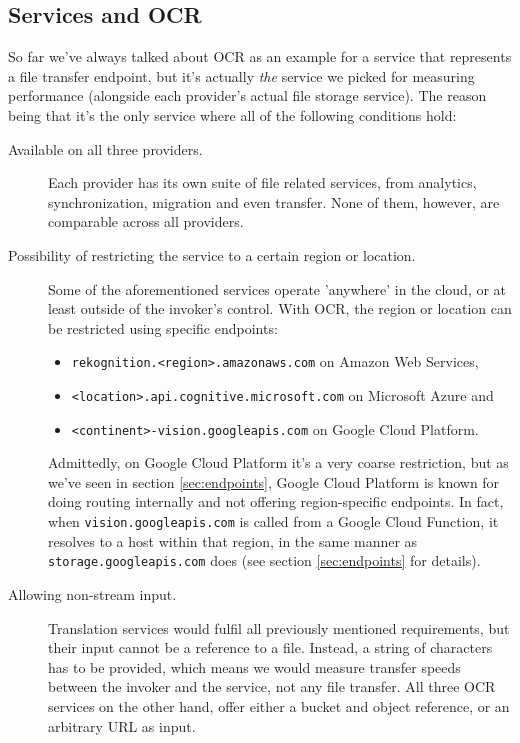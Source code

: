 \documentclass[a4paper,bibliography=totoc]{scrartcl}
\newcommand{\Azure}{Microsoft Azure\xspace}
\newcommand{\GCP}{Google Cloud Platform\xspace}
\newcommand{\AWS}{Amazon Web Services\xspace}
\begin{document}
\subsection{Services and OCR}\label{sec:services_ocr}
So far we've always talked about OCR as an example for a service that represents a file transfer endpoint, but it's actually \textit{the} service we picked for measuring performance (alongside each provider's actual file storage service). The reason being that it's the only service where all of the following conditions hold:
\begin{description}
    \item[Available on all three providers.\cite{aws_rekognition,azure_ocr,gcp_annotate}]
    Each provider has its own suite of file related services, from analytics,\cite{aws_analytics} synchronization,\cite{azure_filesync}  migration and even transfer.\cite{gcp_transfer} None of them, however, are comparable across all providers.
    \item[Possibility of restricting the service to a certain region or location.] Some of the aforementioned services operate 'anywhere' in the cloud, or at least outside of the invoker's control. With OCR, the region or location can be restricted using specific endpoints:
    \begin{itemize}
        \item \texttt{rekognition.<region>.amazonaws.com} on \AWS,\cite{aws_ocr_endpoints}
        \item \texttt{<location>.api.cognitive.microsoft.com} on \Azure\cite{azure_ocr_endpoints} and
        \item \texttt{<continent>-vision.googleapis.com} on \GCP.\cite{gcp_ocr_endpoint}
    \end{itemize}
    Admittedly, on \GCP it's a very coarse restriction, but as we've seen in section \ref{sec:endpoints}, \GCP is known for doing routing internally and not offering region-specific endpoints. In fact, when \texttt{vision.googleapis.com} is called from a Google Cloud Function, it resolves to a host within that region, in the same manner as \texttt{storage.googleapis.com} does (see section \ref{sec:endpoints} for details).
    \item[Allowing non-stream input.] Translation services would fulfil all previously mentioned requirements, but their input cannot be a reference to a file. Instead, a string of characters has to be provided,\cite{aws_translate,azure_translate,gcp_translate} which means we would measure transfer speeds between the invoker and the service, not any file transfer. All three OCR services on the other hand, offer either a bucket and object reference,\cite{aws_rekognition} or an arbitrary URL as input.\cite{azure_ocr,gcp_annotate}

\end{description}
\end{document}
